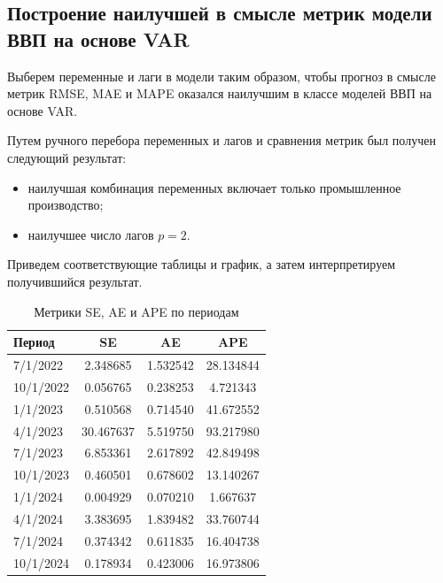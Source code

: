 \documentclass[a4paper, 14pt]{extreport}
\numberwithin{equation}{section}
\numberwithin{equation}{section}
\begin{document}
	
	\subsection{Построение наилучшей в смысле метрик модели ВВП на основе VAR}
	\label{sec:var-2}
	
	Выберем переменные и лаги в модели таким образом, чтобы прогноз в смысле метрик RMSE, MAE и MAPE оказался наилучшим в классе моделей ВВП на основе VAR.
	
	Путем ручного перебора переменных и лагов и сравнения метрик был получен следующий результат:
	\begin{itemize}
		\item наилучшая комбинация переменных включает только промышленное производство;
		\item наилучшее число лагов $p=2$.
	\end{itemize}
	
	Приведем соответствующие таблицы и график, а затем интерпретируем получившийся результат.
	
	\begin{table}[h!]
		\centering
		\caption{Метрики SE, AE и APE по периодам}
		\begin{tabular}{lccc}
			\toprule
			\textbf{Период} & \textbf{SE} & \textbf{AE} & \textbf{APE} \\ 
			\midrule
			7/1/2022  & 2.348685      & 1.532542     & 28.134844     \\ 
			10/1/2022 & 0.056765      & 0.238253     & 4.721343      \\ 
			1/1/2023  & 0.510568      & 0.714540     & 41.672552     \\ 
			4/1/2023  & 30.467637     & 5.519750     & 93.217980     \\ 
			7/1/2023  & 6.853361      & 2.617892     & 42.849498     \\ 
			10/1/2023 & 0.460501      & 0.678602     & 13.140267     \\ 
			1/1/2024  & 0.004929      & 0.070210     & 1.667637      \\ 
			4/1/2024  & 3.383695      & 1.839482     & 33.760744     \\ 
			7/1/2024  & 0.374342      & 0.611835     & 16.404738     \\ 
			10/1/2024 & 0.178934      & 0.423006     & 16.973806     \\ 
			\bottomrule
		\end{tabular}
		\label{tab:metrics-3}
	\end{table}
	
\end{document}
